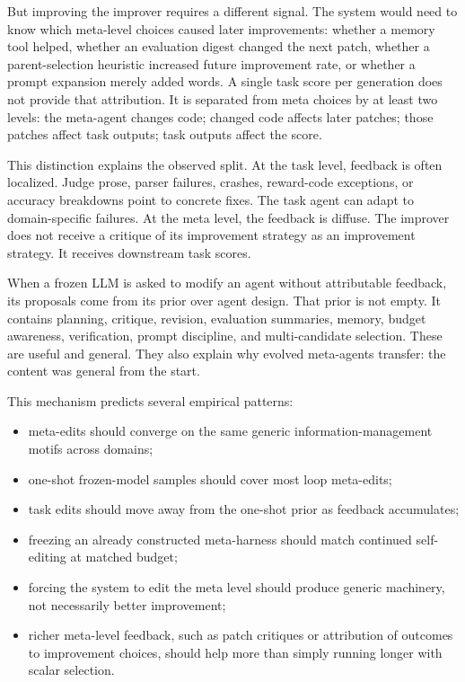 \documentclass[11pt]{article}
\providecommand{\tightlist}{\setlength{\itemsep}{1pt}\setlength{\parskip}{0pt}}
\begin{document}
But improving the improver requires a different signal. The system would need to know which meta-level choices caused later improvements: whether a memory tool helped, whether an evaluation digest changed the next patch, whether a parent-selection heuristic increased future improvement rate, or whether a prompt expansion merely added words. A single task score per generation does not provide that attribution. It is separated from meta choices by at least two levels: the meta-agent changes code; changed code affects later patches; those patches affect task outputs; task outputs affect the score.

This distinction explains the observed split. At the task level, feedback is often localized. Judge prose, parser failures, crashes, reward-code exceptions, or accuracy breakdowns point to concrete fixes. The task agent can adapt to domain-specific failures. At the meta level, the feedback is diffuse. The improver does not receive a critique of its improvement strategy as an improvement strategy. It receives downstream task scores.

When a frozen LLM is asked to modify an agent without attributable feedback, its proposals come from its prior over agent design. That prior is not empty. It contains planning, critique, revision, evaluation summaries, memory, budget awareness, verification, prompt discipline, and multi-candidate selection. These are useful and general. They also explain why evolved meta-agents transfer: the content was general from the start.

This mechanism predicts several empirical patterns:

\begin{itemize}
\tightlist
\item
  meta-edits should converge on the same generic information-management motifs across domains;
\item
  one-shot frozen-model samples should cover most loop meta-edits;
\item
  task edits should move away from the one-shot prior as feedback accumulates;
\item
  freezing an already constructed meta-harness should match continued self-editing at matched budget;
\item
  forcing the system to edit the meta level should produce generic machinery, not necessarily better improvement;
\item
  richer meta-level feedback, such as patch critiques or attribution of outcomes to improvement choices, should help more than simply running longer with scalar selection.
\end{itemize}
\end{document}
